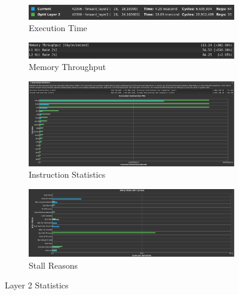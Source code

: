 \documentclass{article}
\begin{document}
\begin{figure}[H]
    \centering
    \begin{subfigure}[b]{\linewidth}
        \includegraphics[width=\linewidth]{reg_share_layer2_summary}
        \caption{Execution Time}
    \end{subfigure}
    \begin{subfigure}[b]{\linewidth}
        \includegraphics[width=\linewidth]{reg_share_layer2_mem}
        \caption{Memory Throughput}
    \end{subfigure}
    \begin{subfigure}[b]{\linewidth}
        \includegraphics[width=\linewidth]{reg_share_layer2_opcode}
        \caption{Instruction Statistics}
    \end{subfigure}
    \begin{subfigure}[b]{\linewidth}
        \includegraphics[width=\linewidth]{reg_share_layer2_warp}
        \caption{Stall Reasons}
    \end{subfigure}
    \caption{Layer 2 Statistics}
\end{figure}
\end{document}
